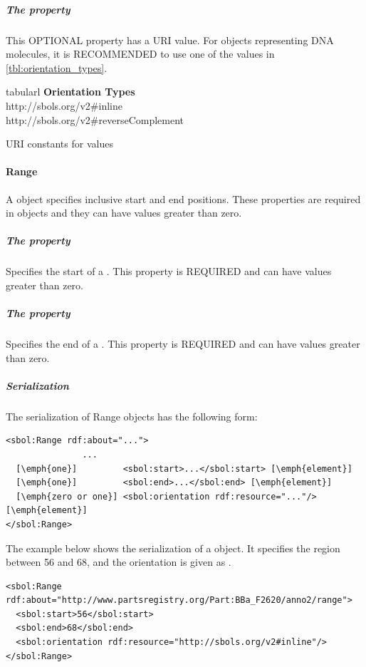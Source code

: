\subparagraph{The  property}
\label{sec:orientation}
This OPTIONAL property has a URI value. For  objects representing DNA molecules, it is RECOMMENDED to use one of the values in \ref{tbl:orientation_types}. 

\begin{table}[ht]
  \begin{edtable}{tabular}{l}
    \toprule
    \textbf{Orientation Types}  \\
    \midrule
    http://sbols.org/v2\#inline\\
    http://sbols.org/v2\#reverseComplement\\
    \bottomrule
  \end{edtable}
  \caption{URI constants for  values}
  \label{tbl:orientation_types}
\end{table}


\paragraph{Range}
\label{sec:Range}
A  object specifies inclusive start and end positions. These properties are required in  objects and they can have  values greater than zero.

\subparagraph{The  property}\label{sec:start}
Specifies the start of a . This property is REQUIRED and can have  values greater than zero.

\subparagraph{The  property}\label{sec:end}
Specifies the end of a . This property is REQUIRED and can have  values greater than zero.


\subparagraph{Serialization}

The serialization of Range objects has the following form:
\begin{lstlisting}
<sbol:Range rdf:about="...">
               ...   
  [\emph{one}]         <sbol:start>...</sbol:start> [\emph{element}] 
  [\emph{one}]         <sbol:end>...</sbol:end> [\emph{element}] 
  [\emph{zero or one}] <sbol:orientation rdf:resource="..."/> [\emph{element}] 
</sbol:Range>
\end{lstlisting}

The example below shows the serialization of a  object. It specifies the region between 56 and 68, and the orientation is given as .
\begin{lstlisting}
<sbol:Range rdf:about="http://www.partsregistry.org/Part:BBa_F2620/anno2/range">
  <sbol:start>56</sbol:start>
  <sbol:end>68</sbol:end>
  <sbol:orientation rdf:resource="http://sbols.org/v2#inline"/>
</sbol:Range>
\end{lstlisting}

